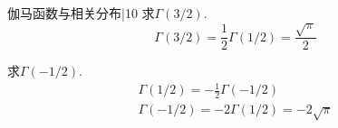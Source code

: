 \newChapter 伽马函数与相关分布|{10}
\exer 求$\Gamma(3/2)$.
\[\Gamma(3/2)=\frac{1}{2}\Gamma(1/2)=\frac{\sqrt\pi}{2}\]

\exer 求$\Gamma(-1/2)$.
\begin{gather*}
\Gamma(1/2)=-\frac{1}{2}\Gamma(-1/2) \\
\Gamma(-1/2)=-2\Gamma(1/2)=-2\sqrt\pi
\end{gather*}